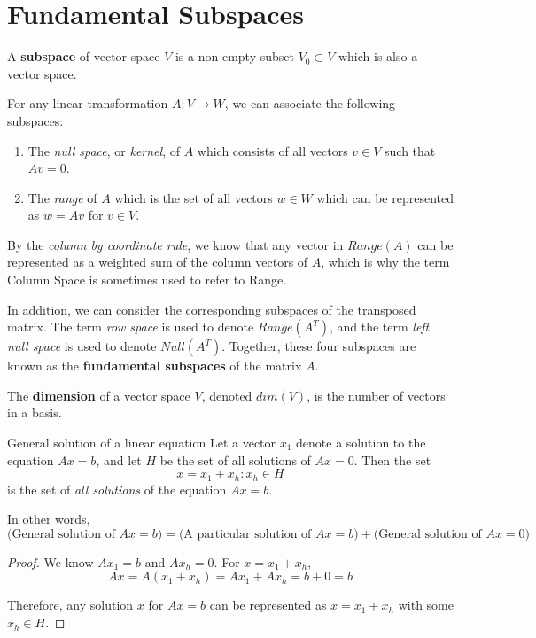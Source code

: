 \section{Fundamental Subspaces}

\begin{definition}
A \textbf{subspace} of vector space $V$ is a non-empty subset $V_{0} \subset V$ which is also a vector space. 
\end{definition}

For any linear transformation $A : V \rightarrow W$, we can associate the following subspaces: 
\begin{enumerate}
	\item The \textit{null space}, or \textit{kernel}, of $A$ which consists of all vectors $v \in V$ such that $Av = 0$. 
	\item The \textit{range} of $A$ which is the set of all vectors $w \in W$ which can be represented as $w = Av$ for $v \in V$. 
\end{enumerate}

By the \textit{column by coordinate rule}, we know that any vector in $Range(A)$ can be represented as a weighted sum of the column vectors of $A$, which is why the term Column Space is sometimes used to refer to Range. 

In addition, we can consider the corresponding subspaces of the transposed matrix. The term \textit{row space} is used to denote $Range(A^{T})$, and the term \textit{left null space} is used to denote $Null(A^{T})$. Together, these four subspaces are known as the \textbf{fundamental subspaces} of the matrix $A$. 

\begin{definition}
The \textbf{dimension} of a vector space $V$, denoted $dim(V)$, is the number of vectors in a basis. 
\end{definition}

\begin{theorem}{General solution of a linear equation} 
Let a vector $x_{1}$ denote a solution to the equation $Ax = b$, and let $H$ be the set of all solutions of $Ax = 0$. Then the set
$$x = x_{1} + x_{h} : x_{h} \in H$$
is the set of \textit{all solutions} of the equation $Ax = b$. 

In other words, 
$$\Big(\text{General solution of $Ax=b$}\Big) = \Big(\text{A particular solution of $Ax=b$}\Big) + \Big(\text{General solution of $Ax=0$}\Big)$$
\end{theorem}

\begin{proof}
We know $Ax_{1} = b$ and $Ax_{h} = 0$. For $x = x_{1} + x_{h}$,
$$Ax = A(x_{1} + x_{h}) = Ax_{1} + Ax_{h} = b + 0 = b$$

Therefore, any solution $x$ for $Ax = b$ can be represented as $x = x_{1} + x_{h}$ with some $x_{h} \in H$. 
\end{proof}

